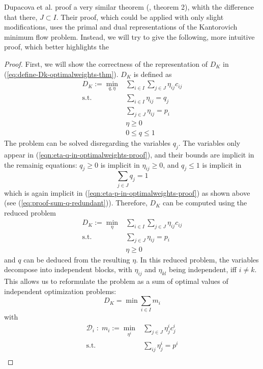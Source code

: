 Dupacova et al. proof a very similar theorem (\cite{Dupacova2003}, theorem 2), whith the difference that there, $J\subset I$. Their proof, which could be applied with only slight modifications, uses the primal and dual representations of the Kantorovich minimum flow problem. Instead, we will try to give the following, more intuitive proof, which better highlights the 
\begin{proof}
First, we will show the correctness of the representation of $D_K$ in (\ref{eq:define-Dk-optimalweights-thm}). $D_K$ is defined as
\begin{align}
  D_K := \min\limits_{q, \eta}& \sum_{i\in I}\sum_{j\in J}\eta_{ij}c_{ij}\\
  \text{s.t.}&\sum_{i\in I}\eta_{ij} = q_j\label{eqn:eta-q-in-optimalweights-proof}\\
  &\sum_{j\in J}\eta_{ij} = p_i\label{eqn:eta-p-in-optimalweights-proof}\\
  &\eta \geq 0\\
  &0 \leq q \leq 1
\end{align}
The problem can be solved disregarding the variables $q_j$. The variables only appear in (\ref{eqn:eta-q-in-optimalweights-proof}), and their bounds are implicit in the remainig equations: $q_j\geq 0$ is implicit in $\eta_{ij}\geq 0$, and $q_j\leq 1$ is implicit in 
\[\sum_{j\in J}q_j=1\]
which is again implicit in (\ref{eqn:eta-p-in-optimalweights-proof}) as shown above (see (\ref{eq:proof-sum-q-redundant})).
Therefore, $D_K$ can be computed using the reduced problem
\begin{align}
  D_K := \min\limits_{\eta}& \sum_{i\in I}\sum_{j\in J}\eta_{ij}c_{ij}\\
  \text{s.t.}&\sum_{j\in J}\eta_{ij} = p_i\\
  &\eta \geq 0
\end{align}
and $q$ can be deduced from the resulting $\eta$.
In this reduced problem, the variables decompose into independent blocks, with $\eta_{ij}$ and $\eta_{kl}$ being independent, iff $i\neq k$.
This allows us to reformulate the problem as a sum of optimal values of independent optimization problems:
\begin{equation}
  \label{eqn:Dk-decomposition-in-mi}
  D_K = \min \sum_{i\in I} m_i
\end{equation}
with
\begin{align}
  \mathcal{D}_i\; :\; m_i :=\min\limits_{\eta^i}&\sum_{j\in J}\eta_{j}^ic_{j}^i\\
  \text{s.t.}&\sum_{ij}\eta_j^i = p^i\\

\end{align}
\end{proof}
